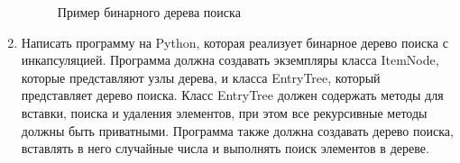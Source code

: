 \begin{enumerate}
\begin{figure}[h]
\centering
{}
\caption{Пример бинарного дерева поиска}
\end{figure}

\item Написать программу на Python, которая реализует бинарное дерево поиска с инкапсуляцией. Программа должна создавать экземпляры класса ItemNode, которые представляют узлы дерева, и класса EntryTree, который представляет дерево поиска. Класс EntryTree должен содержать методы для вставки, поиска и удаления элементов, при этом все рекурсивные методы должны быть приватными. Программа также должна создавать дерево поиска, вставлять в него случайные числа и выполнять поиск элементов в дереве.


\end{enumerate}
